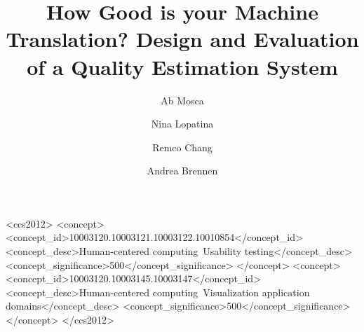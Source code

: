 \documentclass[manuscript,screen, anonymous]{acmart}
\begin{document}
\title[How Good is your Machine Translation?]{How Good is your Machine Translation? Design and Evaluation of a Quality Estimation System}

\author{Ab Mosca}

\author{Nina Lopatina}
\authornotemark[1]

\author{Remco Chang}

\author{Andrea Brennen}

\renewcommand{\shortauthors}{Mosca, Lopatina, et al.}

\begin{abstract}
  
\end{abstract}

\begin{CCSXML}
<ccs2012>
<concept>
<concept_id>10003120.10003121.10003122.10010854</concept_id>
<concept_desc>Human-centered computing~Usability testing</concept_desc>
<concept_significance>500</concept_significance>
</concept>
<concept>
<concept_id>10003120.10003145.10003147</concept_id>
<concept_desc>Human-centered computing~Visualization application domains</concept_desc>
<concept_significance>500</concept_significance>
</concept>
</ccs2012>
\end{CCSXML}

\end{document}
